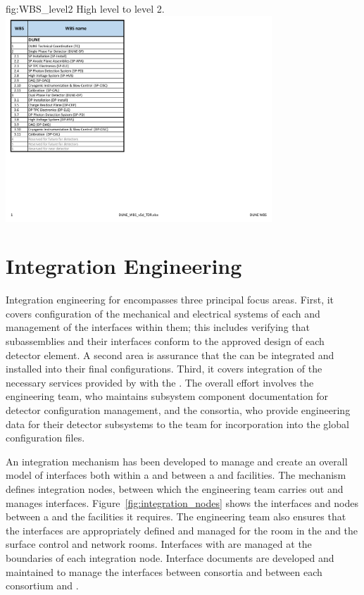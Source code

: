 \begin{dunefigure}{fig:WBS_level2}
  {High level   to level 2.}
  \includegraphics[width=0.75\textwidth]{graphics/WBS_level2_v2}
\end{dunefigure}

\section{Integration Engineering}
\label{sec:es-coord-integ-sysengr}

Integration engineering for  encompasses three principal focus areas. First, it %
covers configuration of the mechanical and electrical systems of each  and management of 
the interfaces within them; this includes verifying that subassemblies
and their interfaces %
conform to the approved design of each detector element.
A second area is assurance that the  can be integrated and
installed into their final configurations. Third, it covers %
integration of the necessary services provided by  
with the . The overall effort involves 
the  engineering team, who maintains
subsystem component documentation for detector
configuration management, and 
the consortia, who provide engineering data for their detector subsystems to the  team for incorporation into the global configuration files.


An integration mechanism has been developed to manage and create an
overall model of interfaces both within a  and
between a  and facilities. The mechanism defines
integration nodes, %
between which the  engineering team carries out and
manages interfaces. %
Figure~\ref{fig:integration_nodes} shows the interfaces and nodes between a
 and the facilities it requires. The  engineering
team also ensures that the interfaces are appropriately defined
and managed for the  room in the  and the surface
control and network rooms. Interfaces with 
are managed at the boundaries of each integration node.  
Interface documents are developed and maintained to manage the
interfaces between consortia and between each consortium and 
.


